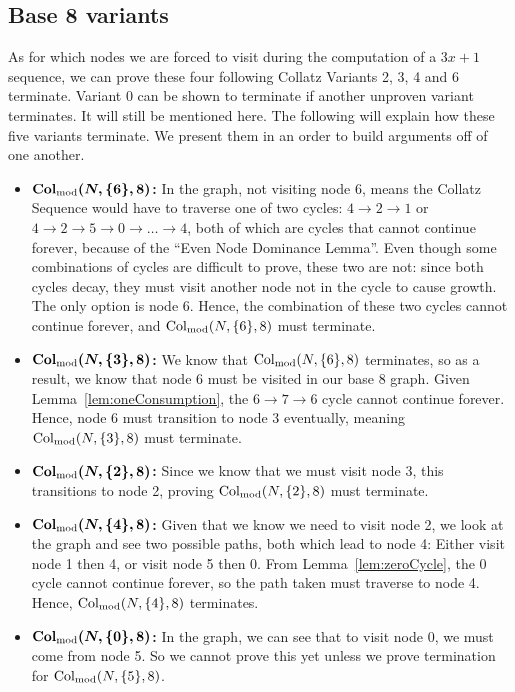 \subsection{Base 8 variants} \label{subsubsec:base8subprob}
As for which nodes we are forced to visit during the computation of a $3x+1$ sequence, we can prove these four following Collatz Variants 2, 3, 4 and 6 terminate. Variant 0 can be shown to terminate if another unproven variant terminates. It will still be mentioned here. The following will explain how these five variants terminate. We present them in an order to build arguments off of one another.
\begin{itemize}
    \item \textbf{$\boldsymbol{\mathrm{Col}_{\text{mod}}(N,\{6\},8)}$:} In the graph, not visiting node $6$, means the Collatz Sequence would have to traverse one of two cycles: $4 \rightarrow 2 \rightarrow 1$ or $4 \rightarrow 2 \rightarrow 5 \rightarrow 0 \rightarrow \ldots \rightarrow 4$, both of which are cycles that cannot continue forever, because of the ``Even Node Dominance Lemma''. Even though some combinations of cycles are difficult to prove, these two are not: since both cycles decay, they must visit another node not in the cycle to cause growth. The only option is node 6. Hence, the combination of these two cycles cannot continue forever, and $\mathrm{Col}_{\text{mod}}(N,\{6\},8)$ must terminate.
    \item \textbf{$\boldsymbol{\mathrm{Col}_{\text{mod}}(N,\{3\},8)}$:} We know that $\mathrm{Col}_{\text{mod}}(N,\{6\},8)$ terminates, so as a result, we know that node 6 must be visited in our base 8 graph.  Given Lemma~\ref{lem:oneConsumption}, the $6 \rightarrow 7 \rightarrow 6$ cycle cannot continue forever. Hence, node 6 must transition to node 3 eventually, meaning $\mathrm{Col}_{\text{mod}}(N,\{3\},8)$ must terminate.
    \item \textbf{$\boldsymbol{\mathrm{Col}_{\text{mod}}(N,\{2\},8)}$:} Since we know that we must visit node 3, this transitions to node 2, proving $\mathrm{Col}_{\text{mod}}(N,\{2\},8)$ must terminate.
    \item \textbf{$\boldsymbol{\mathrm{Col}_{\text{mod}}(N,\{4\},8)}$:} Given that we know we need to visit node 2, we look at the graph and see two possible paths, both which lead to node 4: Either visit node 1 then 4, or visit node 5 then 0. From Lemma~\ref{lem:zeroCycle}, the 0 cycle cannot continue forever, so the path taken must traverse to node 4. Hence, $\mathrm{Col}_{\text{mod}}(N,\{4\},8)$ terminates.
    \item \textbf{$\boldsymbol{\mathrm{Col}_{\text{mod}}(N,\{0\},8)}$:} In the graph, we can see that to visit node 0, we must come from node 5. So we cannot prove this yet unless we prove termination for $\mathrm{Col}_{\text{mod}}(N,\{5\},8)$.
\end{itemize}
